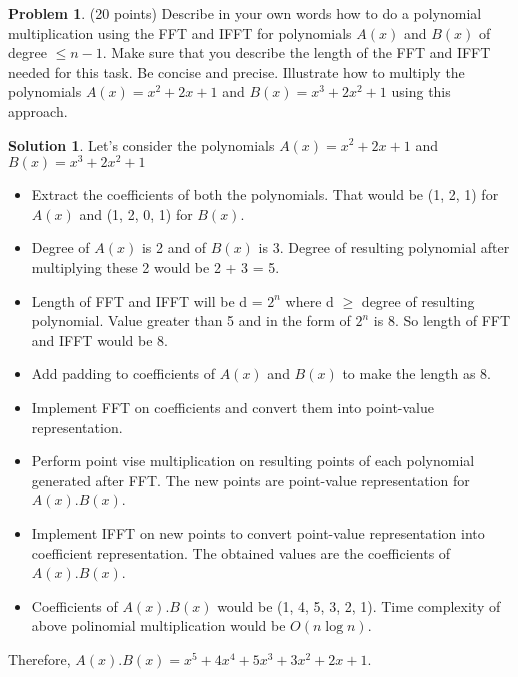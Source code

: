 \documentclass{article}
\theoremstyle{definition}
\newtheorem{problem}{Problem}
\newtheorem*{solution}{Solution}
\begin{document}
\begin{problem} (20 points) 
Describe in your own words how to do a polynomial multiplication using the FFT and
  IFFT for polynomials $A(x)$ and $B(x)$ of degree $\le n-1$. Make
  sure that you describe the length of the FFT and IFFT needed for
  this task. Be concise and precise. Illustrate how to multiply the
  polynomials $A(x) = x^2+2x+1$ and $B(x)=x^3+2x^2+1$ using this
  approach. 
\end{problem}
\begin{solution}
Let's consider the polynomials $A(x) = x^2+2x+1$ and $B(x)=x^3+2x^2+1$
\begin{itemize}
    \item Extract the coefficients of both the polynomials. That would be (1, 2, 1) for $A(x)$ and (1, 2, 0, 1) for $B(x)$.
    \item Degree of $A(x)$ is 2 and of $B(x)$ is 3. Degree of resulting polynomial after multiplying these 2 would be 2 + 3 = 5.
    \item Length of FFT and IFFT will be d = $2^n$ where d $\geq$ degree of resulting polynomial. Value greater than 5 and in the form of $2^n$ is 8. So length of FFT and IFFT would be 8.
    \item Add padding to coefficients of $A(x)$ and $B(x)$ to make the length as 8.
    \item Implement FFT on coefficients and convert them into point-value representation.
    \item Perform point vise multiplication on resulting points of each polynomial generated after FFT. The new points are point-value representation for $A(x).B(x)$.
    \item Implement IFFT on new points to convert point-value representation into coefficient representation. The obtained values are the coefficients of $A(x).B(x)$.
    \item Coefficients of $A(x).B(x)$ would be (1, 4, 5, 3, 2, 1). Time complexity of above polinomial multiplication would be $O(n\log{n})$.
\end{itemize}
Therefore, $A(x).B(x) = x^5 + 4x^4 + 5x^3 + 3x^2 + 2x + 1$.
\end{solution}
\newpage
\end{document}
